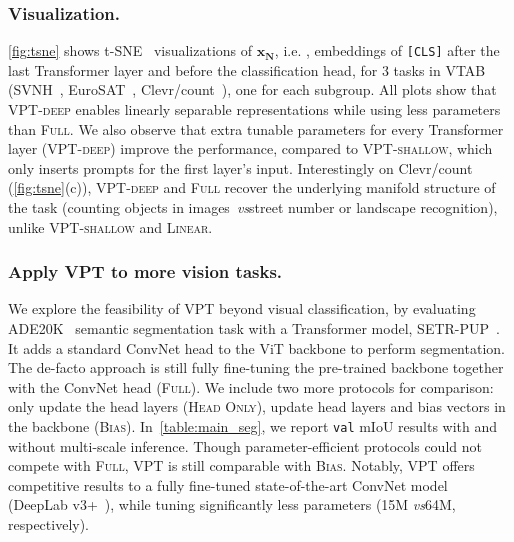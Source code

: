 \subsubsection{Visualization.}
\ref{fig:tsne} shows t-SNE~\cite{van2008visualizing} visualizations of $\mathbf{x_N}$, i.e. , embeddings of \texttt{[CLS]} after the last Transformer layer and before the classification head, for 3 tasks in VTAB (SVNH~\cite{netzer2011reading}, EuroSAT~\cite{helber2019eurosat}, Clevr/count~\cite{johnson2017clevr}), one for each subgroup. All plots show that \textsc{VPT}-\textsc{deep} enables linearly separable representations while using less parameters than \textsc{Full}.
We also observe that extra tunable parameters for every Transformer layer (\textsc{VPT}-\textsc{deep}) improve the performance, compared to \textsc{VPT}-\textsc{shallow}, which only inserts prompts for the first layer's input. Interestingly on Clevr/count (\ref{fig:tsne}(c)), \textsc{VPT}-\textsc{deep} and \textsc{Full} recover the underlying manifold structure of the task (counting objects in images~\emph{vs}\onedot street number or landscape recognition), unlike \textsc{VPT}-\textsc{shallow} and \textsc{Linear}.

\subsubsection{Apply VPT to more vision tasks.} We explore the feasibility of \textsc{VPT} beyond visual classification, by evaluating ADE20K~\cite{zhou2019ade20} semantic segmentation task with a Transformer model, SETR-PUP~\cite{zheng2020rethinking}. It adds a standard ConvNet head to the ViT backbone to perform segmentation. The de-facto approach is still fully fine-tuning the pre-trained backbone together with the ConvNet head (\textsc{Full}). We include two more protocols for comparison: only update the head layers (\textsc{Head Only}), update head layers and bias vectors in the backbone (\textsc{Bias}). 
In~\ref{table:main_seg}, we report {\small\texttt{val}} mIoU results with and without multi-scale inference. Though parameter-efficient protocols could not compete with \textsc{Full}, \textsc{VPT} is still comparable with \textsc{Bias}.
Notably, \textsc{VPT} offers competitive results to a fully fine-tuned state-of-the-art ConvNet model (DeepLab v3+~\cite{chen2018encoder}), while tuning significantly less parameters (15M \emph{vs}\onedot 64M, respectively).

